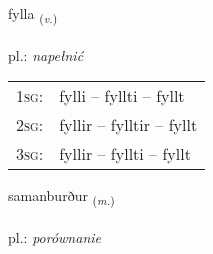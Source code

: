 \documentclass[frontgrid, backgrid]{flacards}\usepackage[]{graphicx}\usepackage[]{xcolor}
\begin{document}
\renewcommand{\flhead}{\vskip5pt \fboxsep=0pt {\small\bfseries\footnotesize Sagnorð | Verb}}
\renewcommand{\fcfoot}{\vskip5pt \fboxsep=0pt \hspace{2pt}{\small\bfseries\footnotesize 2K}}

\renewcommand{\blhead}{\vskip5pt {\small\bfseries\footnotesize Sagnorð | Verb }}
\renewcommand{\bcfoot}{\vskip5pt \hspace{2pt}{\small\bfseries\footnotesize 2K}}


{fylla \small{\textsubscript{(\textit{v.})}} \\[1ex] %
\textphonetic{[fɪtla]} \\
pl.: \emph{napełnić} \\  [2ex]
\renewcommand*{\arraystretch}{0.8}
\begin{tabular}{p{1cm}l}
\textsc{1sg}: & fylli -- fyllti -- fyllt \\ 
\textsc{2sg}: & fyllir -- fylltir -- fyllt \\ 
\textsc{3sg}: & fyllir -- fyllti -- fyllt \\ 
\end{tabular}
}

\renewcommand{\flhead}{\vskip5pt \fboxsep=0pt {\small\bfseries\footnotesize Nafnorð | Noun}}
\renewcommand{\fcfoot}{\vskip5pt \fboxsep=0pt \hspace{2pt}{\small\bfseries\footnotesize 2K}}

\renewcommand{\blhead}{\vskip5pt {\small\bfseries\footnotesize Nafnorð | Noun }}
\renewcommand{\bcfoot}{\vskip5pt \hspace{2pt}{\small\bfseries\footnotesize 2K}}


{samanburður \small{\textsubscript{(\textit{m.})}} \\[1ex] %
\textphonetic{[saːmanpʏrðʏr]} \\
pl.: \emph{porównanie} \\  [2ex]
\renewcommand*{\arraystretch}{0.8}
}
\end{document}
